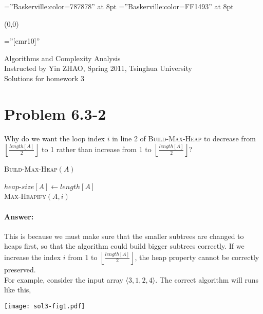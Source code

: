 \documentclass[a4paper,10pt]{article}
\newcommand{\problem}[1]{\section*{Problem #1}}
\newcommand{\answer}{\paragraph{Answer:}}
\begin{document}
\font\wm=''Baskerville:color=787878'' at 8pt
\font\wmtoday=''Baskerville:color=FF1493'' at 8pt
{\wm 
	\begin{textblock}{1}(0,0)
	\end{textblock}
}

\pagestyle{empty} %

\font\fb=''[cmr10]'' %

\par{\centering
  {\Large Algorithms and Complexity Analysis}
  \\\vspace{0.5em}
  { Instructed by Yin ZHAO, Spring 2011, Tsinghua University}
  \\\vspace{1.5em}
	{\Huge Solutions for homework 3\vspace{1em}
	}\bigskip\par}


\problem{6.3-2}
Why do we want the loop index $i$ in line 2 of \textsc{Build-Max-Heap} to decrease from 
$\left\lfloor \frac{length[A]}{2}\right\rfloor$ to 1 rather than increase from 1
to $\left\lfloor \frac{length[A]}{2}\right\rfloor$?

\begin{algorithm}[H]
\caption{\textsc{Build-Max-Heap}$(A)$}
$heap$-$size[A]\leftarrow length[A]$\\
 {
  \textsc{Max-Heapify}$(A, i)$
}
\end{algorithm}

\answer

This is because we must make sure that the smaller subtrees are changed to heaps first, so that the
algorithm could build bigger subtrees correctly. If we increase the index $i$ from 1 to
$\left\lfloor\frac{length[A]}{2}\right\rfloor$, the heap property cannot be correctly preserved.\\

For example, consider the input array $\langle 3, 1, 2, 4\rangle$. The correct algorithm will
runs like this,

\begin{center}
  \texttt{[image: sol3-fig1.pdf]}
\end{center}
\end{document}

